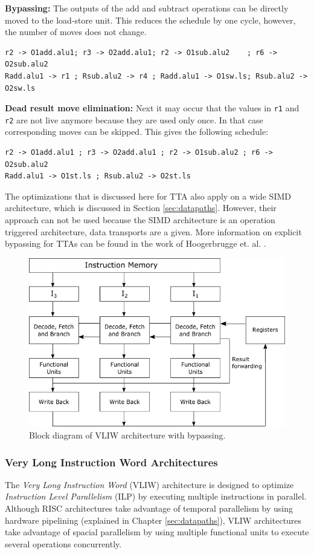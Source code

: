 \textbf{Bypassing:} The outputs of the add and subtract operations can be directly moved to the load-store unit. This reduces the schedule by one cycle, however, the number of moves does not change.

\begin{lstlisting}
r2 -> O1add.alu1; r3 -> O2add.alu1; r2 -> O1sub.alu2    ; r6 -> O2sub.alu2
Radd.alu1 -> r1 ; Rsub.alu2 -> r4 ; Radd.alu1 -> O1sw.ls; Rsub.alu2 -> O2sw.ls
\end{lstlisting}

\textbf{Dead result move elimination:} Next it may occur that the values in \texttt{r1} and \texttt{r2} are not live anymore because they are used only once. In that case corresponding moves can be skipped. This gives the following schedule:

\begin{lstlisting}
r2 -> O1add.alu1 ; r3 -> O2add.alu1 ; r2 -> O1sub.alu2 ; r6 -> O2sub.alu2 
Radd.alu1 -> O1st.ls ; Rsub.alu2 -> O2st.ls
\end{lstlisting}

The optimizations that is discussed here for TTA also apply on a wide SIMD architecture, which is discussed in Section \ref{sec:datapaths}. However, their approach can not be used because the SIMD architecture is an operation triggered architecture, data transports are a given. More information on explicit bypassing for TTAs can be found in the work of Hoogerbrugge et. al. \cite{tta, tta_codegen}.


\begin{figure}[b!]
\centering
\includegraphics[width=.65\textwidth]{figures/vliw_forwarding}
\caption{Block diagram of VLIW architecture with bypassing.}
\label{fig:vliw}
\end{figure}

\subsubsection{Very Long Instruction Word Architectures}
The \emph{Very Long Instruction Word} (VLIW) architecture is designed to optimize \emph{Instruction Level Parallelism} (ILP) by executing multiple instructions in parallel.
Although RISC architectures take advantage of temporal parallelism by using hardware pipelining (explained in Chapter \ref{sec:datapaths}), VLIW architectures take advantage of spacial parallelism by using multiple functional units to execute several operations concurrently. 

